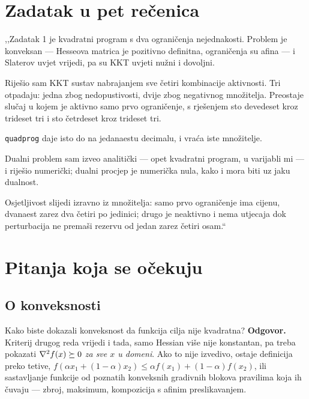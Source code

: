 \section{Zadatak u pet rečenica}
\label{sec:z1o-sazetak}

\begin{izgovor}
,,Zadatak 1 je kvadratni program s dva ograničenja nejednakosti. Problem je
konveksan --- Hesseova matrica je pozitivno definitna, ograničenja su afina --- i
Slaterov uvjet vrijedi, pa su KKT uvjeti nužni i dovoljni.

Riješio sam KKT sustav nabrajanjem sve četiri kombinacije aktivnosti. Tri
otpadaju: jedna zbog nedopustivosti, dvije zbog negativnog množitelja. Preostaje
slučaj u kojem je aktivno samo prvo ograničenje, s rješenjem sto devedeset kroz
trideset tri i sto četrdeset kroz trideset tri.

\texttt{quadprog} daje isto do na jedanaestu decimalu, i vraća iste množitelje.

Dualni problem sam izveo analitički --- opet kvadratni program, u varijabli mi --- i
riješio numerički; dualni procjep je numerička nula, kako i mora biti uz jaku
dualnost.

Osjetljivost slijedi izravno iz množitelja: samo prvo ograničenje ima cijenu,
dvanaest zarez dva četiri po jedinici; drugo je neaktivno i nema utjecaja dok
perturbacija ne premaši rezervu od jedan zarez četiri osam.``
\end{izgovor}

\section{Pitanja koja se očekuju}
\label{sec:z1o-pitanja}

\subsection{O konveksnosti}

\begin{pitanje}{Kako biste dokazali konveksnost da funkcija cilja nije kvadratna?}
\textbf{Odgovor.} Kriterij drugog reda vrijedi i tada, samo Hessian više nije
konstantan, pa treba pokazati $\nabla^2 f(x) \succeq 0$ \emph{za sve $x$ u domeni}.
Ako to nije izvedivo, ostaje definicija preko tetive,
$f(\alpha x_1 + (1-\alpha)x_2) \leq \alpha f(x_1) + (1-\alpha)f(x_2)$, ili
sastavljanje funkcije od poznatih konveksnih gradivnih blokova pravilima koja ih
čuvaju --- zbroj, maksimum, kompozicija s afinim preslikavanjem.
\end{pitanje}

